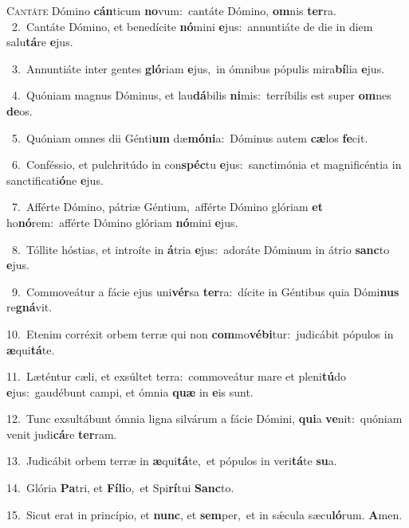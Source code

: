 \lettrine{\initial\textcolor{\initialcolor}{C}}{antáte} Dómino \textbf{cán}\-ticum \textbf{no}\-vum:~\star cantáte Dómino, \textbf{om}\-nis \textbf{ter}\-ra.\\
{\numbfont\textcolor{\numbcolor}{~2.}}~Cantáte Dómino, et benedícite \textbf{nó}\-mini \textbf{e}\-jus:~\star annuntiáte de die in diem salu\-\textbf{tá}\-re \textbf{e}\-jus.\par
{\numbfont\textcolor{\numbcolor}{~3.}}~Annuntiáte inter gentes \textbf{gló}\-riam \textbf{e}\-jus,~\star in ómnibus pópulis mira\-\textbf{bí}\-lia \textbf{e}\-jus.\par
{\numbfont\textcolor{\numbcolor}{~4.}}~Quóniam magnus Dóminus, et lau\-\textbf{dá}\-bilis \textbf{ni}\-mis:~\star terríbilis est super \textbf{om}\-nes \textbf{de}\-os.\par
{\numbfont\textcolor{\numbcolor}{~5.}}~Quóniam omnes dii Génti\textbf{um} dæ\-\textbf{mó}\-\textbf{ni}a:~\star Dóminus autem \textbf{cæ}\-los \textbf{fe}\-cit.\par
{\numbfont\textcolor{\numbcolor}{~6.}}~Conféssio, et pulchritúdo in con\-\textbf{spéc}\-tu \textbf{e}\-jus:~\star sanctimónia et magnificéntia in sanctificati\-\textbf{ó}\-ne \textbf{e}\-jus.\par
{\numbfont\textcolor{\numbcolor}{~7.}}~Afférte Dómino, pátriæ Géntium,~\dagger afférte Dómino glóriam \textbf{et} ho\-\textbf{nó}\-rem:~\star afférte Dómino glóriam \textbf{nó}\-mini \textbf{e}\-jus.\par
{\numbfont\textcolor{\numbcolor}{~8.}}~Tóllite hóstias, et introíte in \textbf{á}\-tria \textbf{e}\-jus:~\star adoráte Dóminum in átrio \textbf{sanc}\-to \textbf{e}\-jus.\par
{\numbfont\textcolor{\numbcolor}{~9.}}~Commoveátur a fácie ejus uni\-\textbf{vér}\-sa \textbf{ter}\-ra:~\star dícite in Géntibus quia Dómi\textbf{nus} re\-\textbf{gná}\-vit.\par
{\numbfont\textcolor{\numbcolor}{10.}}~Etenim corréxit orbem terræ qui non \textbf{com}\-mo\-\textbf{vé}\-\textbf{bi}tur:~\star judicábit pópulos in \textbf{æ}\-qui\-\textbf{tá}\-te.\par
{\numbfont\textcolor{\numbcolor}{11.}}~Læténtur cæli, et exsúltet terra:~\dagger commoveátur mare et pleni\-\textbf{tú}\-do \textbf{e}\-jus:~\star gaudébunt campi, et ómnia \textbf{quæ} in \textbf{e}\-is sunt.\par
{\numbfont\textcolor{\numbcolor}{12.}}~Tunc exsultábunt ómnia ligna silvárum a fácie Dómini, \textbf{qui}\-a \textbf{ve}\-nit:~\star quóniam venit judi\-\textbf{cá}\-re \textbf{ter}\-ram.\par
{\numbfont\textcolor{\numbcolor}{13.}}~Judicábit orbem terræ in \textbf{æ}\-qui\-\textbf{tá}\-te,~\star et pópulos in veri\-\textbf{tá}\-te \textbf{su}\-a.\par
{\numbfont\textcolor{\numbcolor}{14.}}~Glória \textbf{Pa}\-tri, et \textbf{Fí}\-\textbf{li}o,~\star et Spi\-\textbf{rí}\-tui \textbf{Sanc}\-to.\par
{\numbfont\textcolor{\numbcolor}{15.}}~Sicut erat in princípio, et \textbf{nunc}\-, et \textbf{sem}\-per,~\star et in sǽcula sæcu\-\textbf{ló}\-rum. \textbf{A}\-men.\par
